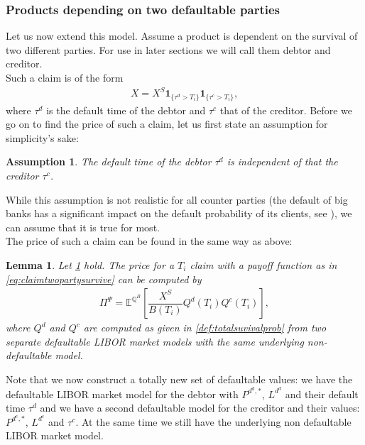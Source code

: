 \documentclass[12pt]{article}
\newtheorem{assumption}{Assumption}[section]
\newtheorem{lemma}[theorem]{Lemma}
\begin{document}
	\subsubsection{Products depending on two defaultable parties}
	Let us now extend this model. Assume a product is dependent on the survival of two different parties. For use in later sections we will call them debtor and  creditor.\\
	Such a claim is of the form
	\begin{align}\label{eq:claimtwopartysurvive}
		X = X^S\mathbf{1}_{\{\tau^d > T_i\}}\mathbf{1}_{\{\tau^c > T_i\}},
	\end{align}
	where $\tau^d$ is the default time of the debtor and $\tau^c$ that of the creditor.
	Before we go on to find the price of such a claim, let us first state an assumption for simplicity's sake:
	\begin{assumption}\label{as:counterpartiesareindependent}
		The default time of the debtor $\tau^d$ is independent of that the creditor $\tau^c$.
	\end{assumption}
	While this assumption is not realistic for all counter parties (the default of big banks has a significant impact on the default probability of its clients, see \cite{onDominoEffects}),	we can assume that it is true for most.\\
	The price of such a claim can be found in the same way as above:
	\begin{lemma}\label{lem:creditordefPrice}
		Let \cref{as:counterpartiesareindependent} hold. The price for a $T_i$ claim with a payoff function as in \cref{eq:claimtwopartysurvive} can be computed by
		\begin{align*}
			\Pi^\Psi = \mathbb{E}^{\mathbb{Q}^B}\left[\dfrac{X^S}{B(T_i)}Q^d(T_i)Q^c(T_i)\right],
		\end{align*}
		where $Q^d$ and $Q^c$ are computed as given in \cref{def:totalsuvivalprob} from two separate defaultable LIBOR market models with the same underlying non-defaultable model.
	\end{lemma}
	Note that we now construct a totally new set of defaultable values: we have the defaultable LIBOR market model for the debtor with $P^{d^d,*}$, $L^{d^d}$ and their default time $\tau^d$ and we have a second defaultable model for the creditor and their values: $P^{d^c,*}$, $L^{d^c}$ and $\tau^c$. At the same time we still have the underlying non defaultable LIBOR market model.
\end{document}
